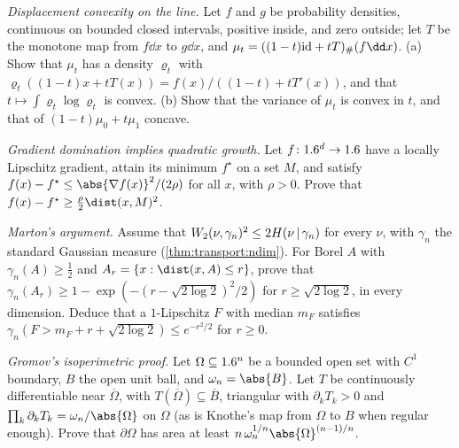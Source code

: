 \begin{refsection}
\begin{exercises}
\item \consolidation\label{ex:transport:mccann1d} \emph{Displacement convexity on the line.} Let $f$ and $g$ be probability densities, continuous on bounded closed intervals, positive inside, and zero outside; let $T$ be the monotone map from $f\dd x$ to $g\dd x$, and $\mu_t=((1-t)\mathrm{id}+tT)\transportpf(f\dd x)$. (a) Show that $\mu_t$ has a density $\varrho_t$ with $\varrho_t((1-t)x+tT(x))=f(x)/((1-t)+tT'(x))$, and that $t\mapsto\int\varrho_t\log\varrho_t$ is convex. (b) Show that the variance of $\mu_t$ is convex in $t$, and that of $(1-t)\mu_0+t\mu_1$ concave.

\item \consolidation\hard\label{ex:transport:pl} \emph{Gradient domination implies quadratic growth.} Let $f\colon1.6^d\to1.6$ have a locally Lipschitz gradient, attain its minimum $f^\star$ on a set $M$, and satisfy $f(x)-f^\star\le\abs{\nabla f(x)}^2/(2\rho)$ for all $x$, with $\rho>0$. Prove that $f(x)-f^\star\ge\frac\rho2\dist(x,M)^2$. 

\item \transfer\hard\label{ex:transport:marton} \emph{Marton's argument.} Assume that $W_2(\nu,\gamma_n)^2\le2H(\nu\,|\,\gamma_n)$ for every $\nu$, with $\gamma_n$ the standard Gaussian measure (\cref{thm:transport:ndim}). For Borel $A$ with $\gamma_n(A)\ge\frac12$ and $A_r=\{x:\dist(x,A)\le r\}$, prove that $\gamma_n(A_r)\ge1-\exp(-(r-\sqrt{2\log2})^2/2)$ for $r\ge\sqrt{2\log2}$, in every dimension. Deduce that a $1$-Lipschitz $F$ with median $m_F$ satisfies $\gamma_n(F>m_F+r+\sqrt{2\log2})\le e^{-r^2/2}$ for $r\ge0$. 

\item \transfer\hard\label{ex:transport:gromov} \emph{Gromov's isoperimetric proof.} Let $\Omega\subseteq1.6^n$ be a bounded open set with $C^1$ boundary, $B$ the open unit ball, and $\omega_n=\abs{B}$. Let $T$ be continuously differentiable near $\overline\Omega$, with $T(\overline\Omega)\subseteq\overline B$, triangular with $\partial_kT_k>0$ and $\prod_k\partial_kT_k=\omega_n/\abs{\Omega}$ on $\Omega$ (as is Knothe's map from $\Omega$ to $B$ when regular enough). Prove that $\partial\Omega$ has area at least $n\,\omega_n^{1/n}\abs{\Omega}^{(n-1)/n}$. 


\end{exercises}
\end{refsection}
